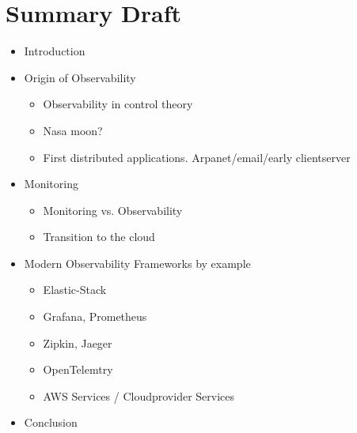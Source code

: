 \documentclass[11pt, manuscript, screen, nonacm=true, natbib=true]{acmart-backref}
\begin{document}
\section{Summary Draft}
\begin{itemize}
\item Introduction
\item Origin of Observability
\begin{itemize}
    \item Observability in control theory
    \item Nasa moon?
    \item First distributed applications. Arpanet/email/early clientserver
\end{itemize}
\item Monitoring
\begin{itemize}
    \item Monitoring vs. Observability
    \item Transition to the cloud
\end{itemize}
\item Modern Observability Frameworks by example
\begin{itemize}
    \item Elastic-Stack
    \item Grafana, Prometheus
    \item Zipkin, Jaeger
    \item OpenTelemtry
    \item AWS Services / Cloudprovider Services
\end{itemize}
\item Conclusion
\end{itemize}




\appendix
\end{document}
